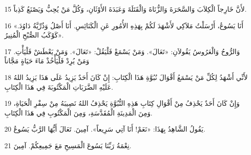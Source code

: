 \par 15 لأَنَّ خَارِجاً الْكِلاَبَ وَالسَّحَرَةَ وَالزُّنَاةَ وَالْقَتَلَةَ وَعَبَدَةَ الأَوْثَانِ، وَكُلَّ مَنْ يُحِبُّ وَيَصْنَعُ كَذِباً.
\par 16 «أَنَا يَسُوعُ، أَرْسَلْتُ مَلاَكِي لأَشْهَدَ لَكُمْ بِهَذِهِ الأُمُورِ عَنِ الْكَنَائِسِ. أَنَا أَصْلُ وَذُرِّيَّةُ دَاوُدَ. كَوْكَبُ الصُّبْحِ الْمُنِيرُ».
\par 17 وَالرُّوحُ وَالْعَرُوسُ يَقُولاَنِ: «تَعَالَ». وَمَنْ يَسْمَعْ فَلْيَقُلْ: «تَعَالَ». وَمَنْ يَعْطَشْ فَلْيَأْتِ. وَمَنْ يُرِدْ فَلْيَأْخُذْ مَاءَ حَيَاةٍ مَجَّاناً
\par 18 لأَنِّي أَشْهَدُ لِكُلِّ مَنْ يَسْمَعُ أَقْوَالَ نُبُوَّةِ هَذَا الْكِتَابِ: إِنْ كَانَ أَحَدٌ يَزِيدُ عَلَى هَذَا يَزِيدُ اللهُ عَلَيْهِ الضَّرَبَاتِ الْمَكْتُوبَةَ فِي هَذَا الْكِتَابِ.
\par 19 وَإِنْ كَانَ أَحَدٌ يَحْذِفُ مِنْ أَقْوَالِ كِتَابِ هَذِهِ النُّبُوَّةِ يَحْذِفُ اللهُ نَصِيبَهُ مِنْ سِفْرِ الْحَيَاةِ، وَمِنَ الْمَدِينَةِ الْمُقَدَّسَةِ، وَمِنَ الْمَكْتُوبِ فِي هَذَا الْكِتَابِ.
\par 20 يَقُولُ الشَّاهِدُ بِهَذَا: «نَعَمْ! أَنَا آتِي سَرِيعاً». آمِينَ. تَعَالَ أَيُّهَا الرَّبُّ يَسُوعُ.
\par 21 نِعْمَةُ رَبِّنَا يَسُوعَ الْمَسِيحِ مَعَ جَمِيعِكُمْ. آمِينَ.

